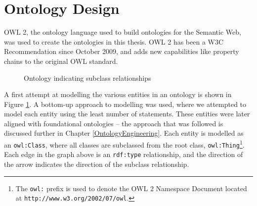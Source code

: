 



\section{Ontology Design}
\label{OntologyDesign1}

\ac{OWL} 2, the ontology language used to build ontologies for the Semantic Web, was used to create the ontologies in this thesis. \ac{OWL} 2 has been a W3C Recommendation since October 2009, and adds new capabilities like property chains to the original \ac{OWL} standard. %

\begin{figure}[bth]
	\caption{Ontology indicating subclass relationships}
	\label{ontology1}
\end{figure}


A first attempt at modelling the various entities in an ontology is shown in Figure \ref{ontology1}. A bottom-up approach to modelling was used, where we attempted to model each entity using the least number of statements. These entities were later aligned with foundational ontologies -- the approach that was followed is discussed further in Chapter \ref{OntologyEngineering}. Each entity is modelled as an \texttt{owl:Class}, where all classes are subclassed from the root class, \texttt{owl:Thing}\footnote{The \texttt{owl:} prefix is used to denote the \ac{OWL} 2 Namespace Document located at \texttt{http://www.w3.org/2002/07/owl}.}. Each edge in the graph above is an \texttt{rdf:type} relationship, and the direction of the arrow indicates the direction of the subclass relationship.

